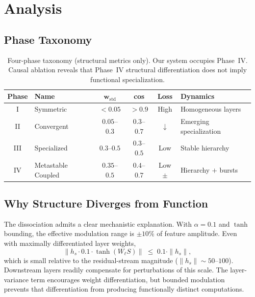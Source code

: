 \documentclass[11pt,a4paper]{article}
\newcommand{\wstd}{w_{\mathrm{std}}}
\begin{document}
\section{Analysis}

\subsection{Phase Taxonomy}

\begin{table}[h]
\centering
\begin{tabular}{clccc p{4.2cm}}
\toprule
\textbf{Phase} & \textbf{Name} & $\boldsymbol{\wstd}$ & \textbf{cos} & \textbf{Loss} & \textbf{Dynamics} \\
\midrule
I   & Symmetric          & $<0.05$       & $>0.9$      & High         & Homogeneous layers \\
II  & Convergent         & $0.05$--$0.3$ & $0.3$--$0.7$& $\downarrow$ & Emerging specialization \\
III & Specialized        & $0.3$--$0.5$  & $0.3$--$0.5$& Low          & Stable hierarchy \\
IV  & Metastable Coupled & $0.35$--$0.5$ & $0.4$--$0.7$& Low$\pm$     & Hierarchy $+$ bursts \\
\bottomrule
\end{tabular}
\caption{Four-phase taxonomy (structural metrics only). Our system occupies Phase~IV.
Causal ablation reveals that Phase~IV structural differentiation does not imply
functional specialization.}
\end{table}

\subsection{Why Structure Diverges from Function}

The dissociation admits a clear mechanistic explanation. With $\alpha=0.1$ and $\tanh$
bounding, the effective modulation range is $\pm10\%$ of feature amplitude. Even with
maximally differentiated layer weights,
\[
  \|h_s \cdot 0.1 \cdot \tanh(W_\ell S)\| \;\leq\; 0.1\cdot\|h_s\|,
\]
which is small relative to the residual-stream magnitude
($\|h_s\|\sim50$--$100$). Downstream layers readily compensate for perturbations of
this scale. The layer-variance term encourages weight differentiation, but bounded
modulation prevents that differentiation from producing functionally distinct
computations.
\end{document}
